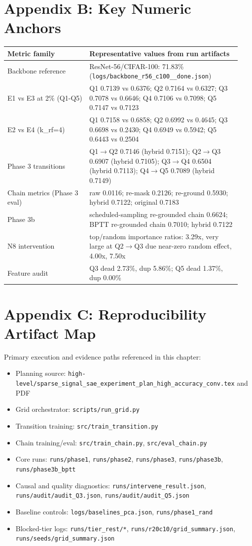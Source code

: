 \documentclass[11pt]{article}
\begin{document}
\section{Appendix B: Key Numeric Anchors}
\begin{longtable}{p{0.33\linewidth}p{0.61\linewidth}}
\toprule
Metric family & Representative values from run artifacts \\
\midrule
Backbone reference & ResNet-56/CIFAR-100: 71.83\% (\texttt{logs/backbone\_r56\_c100\_\_done.json}) \\
E1 vs E3 at 2\% (Q1-Q5) & Q1 0.7139 vs 0.6376; Q2 0.7164 vs 0.6327; Q3 0.7078 vs 0.6646; Q4 0.7106 vs 0.7098; Q5 0.7147 vs 0.7123 \\
E2 vs E4 (k\_rf=4) & Q1 0.7158 vs 0.6858; Q2 0.6992 vs 0.4645; Q3 0.6698 vs 0.2430; Q4 0.6949 vs 0.5942; Q5 0.6443 vs 0.2504 \\
Phase 3 transitions & Q1$\rightarrow$Q2 0.7146 (hybrid 0.7151); Q2$\rightarrow$Q3 0.6907 (hybrid 0.7105); Q3$\rightarrow$Q4 0.6504 (hybrid 0.7113); Q4$\rightarrow$Q5 0.7089 (hybrid 0.7149) \\
Chain metrics (Phase 3 eval) & raw 0.0116; re-mask 0.2126; re-ground 0.5930; hybrid 0.7122; original 0.7183 \\
Phase 3b & scheduled-sampling re-grounded chain 0.6624; BPTT re-grounded chain 0.7010; hybrid 0.7122 \\
N8 intervention & top/random importance ratios: 3.29x, very large at Q2$\rightarrow$Q3 due near-zero random effect, 4.00x, 7.50x \\
Feature audit & Q3 dead 2.73\%, dup 5.86\%; Q5 dead 1.37\%, dup 0.00\% \\
\bottomrule
\end{longtable}

\section{Appendix C: Reproducibility Artifact Map}
Primary execution and evidence paths referenced in this chapter:
\begin{itemize}
    \item Planning source: \texttt{high-level/sparse\_signal\_sae\_experiment\_plan\_high\_accuracy\_conv.tex} and PDF
    \item Grid orchestrator: \texttt{scripts/run\_grid.py}
    \item Transition training: \texttt{src/train\_transition.py}
    \item Chain training/eval: \texttt{src/train\_chain.py}, \texttt{src/eval\_chain.py}
    \item Core runs: \texttt{runs/phase1}, \texttt{runs/phase2}, \texttt{runs/phase3}, \texttt{runs/phase3b}, \texttt{runs/phase3b\_bptt}
    \item Causal and quality diagnostics: \texttt{runs/intervene\_result.json}, \texttt{runs/audit/audit\_Q3.json}, \texttt{runs/audit/audit\_Q5.json}
    \item Baseline controls: \texttt{logs/baselines\_pca.json}, \texttt{runs/phase1\_rand}
    \item Blocked-tier logs: \texttt{runs/tier\_rest/*}, \texttt{runs/r20c10/grid\_summary.json}, \texttt{runs/seeds/grid\_summary.json}
\end{itemize}
\end{document}
